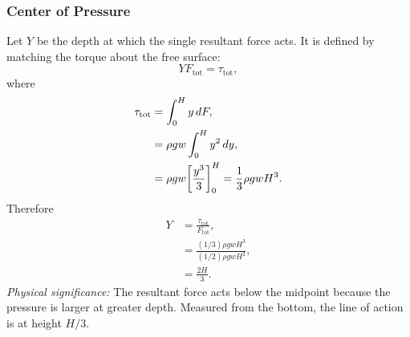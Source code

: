 \documentclass[../main.tex]{subfiles}
\begin{document}
\subsubsection{Center of Pressure}\label{subsec:lec11:center-pressure}
Let $Y$ be the depth at which the single resultant force acts. It is defined by matching the torque about the free surface:
\begin{equation}
  YF_{\mathrm{tot}}=\tau_{\mathrm{tot}},
  \label{eq:lec11_center_pressure_definition}
\end{equation}
where
\begin{align}
  \tau_{\mathrm{tot}}
  &=\int_0^H y\,dF,
  \label{eq:lec11_dam_torque_int_1}\\
  &=\rho g w\int_0^H y^2\,dy,
  \label{eq:lec11_dam_torque_int_2}\\
  &=\rho g w\qty[\frac{y^3}{3}]_0^H
  =
  \frac{1}{3}\rho g wH^3.
  \label{eq:lec11_dam_torque}
\end{align}
Therefore
\begin{align}
  Y
  &=
  \frac{\tau_{\mathrm{tot}}}{F_{\mathrm{tot}}},
  \label{eq:lec11_center_pressure_calc_1}\\
  &=
  \frac{(1/3)\rho g wH^3}{(1/2)\rho g wH^2},
  \label{eq:lec11_center_pressure_calc_2}\\
  &=
  \boxed{\frac{2H}{3}.}
  \label{eq:lec11_center_pressure_result}
\end{align}
\textit{Physical significance:} The resultant force acts below the midpoint because the pressure is larger at greater depth. Measured from the bottom, the line of action is at height $H/3$.

\begin{center}
\end{center}

\end{document}
